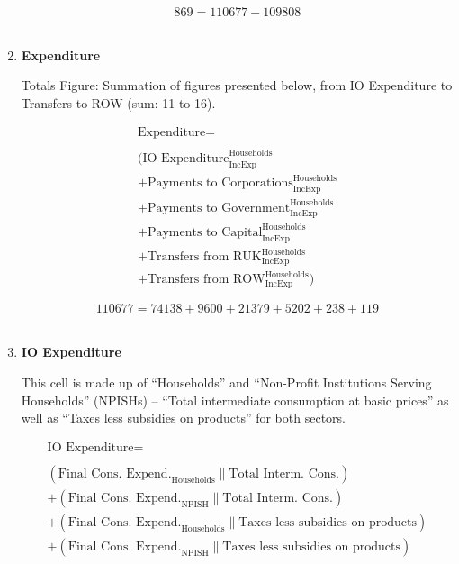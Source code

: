 \begin{enumerate}
\begin{equation} \nonumber
869 = 110677-109808
\end{equation}\\


\pagebreak

\item \textbf {Expenditure}

Totals Figure: Summation of figures presented below, from IO Expenditure to Transfers to ROW (sum: 11 to 16).

\begin{equation}
\begin{split}
\text{Expenditure} =  \\ \\
(\text{IO Expenditure}^\text{Households}_\text{IncExp}\\
+\text{Payments to Corporations}^\text{Households}_\text{IncExp}\\
+\text{Payments to Government}^\text{Households}_\text{IncExp}\\
+\text{Payments to Capital}^\text{Households}_\text{IncExp}\\
+\text{Transfers from RUK}^\text{Households}_\text{IncExp}\\
+\text{Transfers from ROW}^\text{Households}_\text{IncExp})
\end{split} \label{eq:2.5.14}
\end{equation}

\begin{equation} \nonumber
110677 = 74138+9600+21379+5202+238+119
\end{equation}\\


\item \textbf {IO Expenditure}

This cell is made up of ``Households'' and ``Non-Profit Institutions Serving Households'' (NPISHs) – ``Total intermediate consumption at basic prices'' as well as ``Taxes less subsidies on products'' for both sectors. \cite{ScotGov2013a}

\begin{equation}
\begin{split}
\text{IO Expenditure} =  \\ \\
(\text{Final Cons. Expend.}_\text{Households}\|\text{Total Interm. Cons.})\\
+(\text{Final Cons. Expend.}_\text{NPISH}\|\text{Total Interm. Cons.})\\
+(\text{Final Cons. Expend.}_\text{Households}\|\text{Taxes less subsidies on products})\\
+(\text{Final Cons. Expend.}_\text{NPISH}\|\text{Taxes less subsidies on products})
\end{split} \label{eq:2.5.15}
\end{equation}


\end{enumerate}
